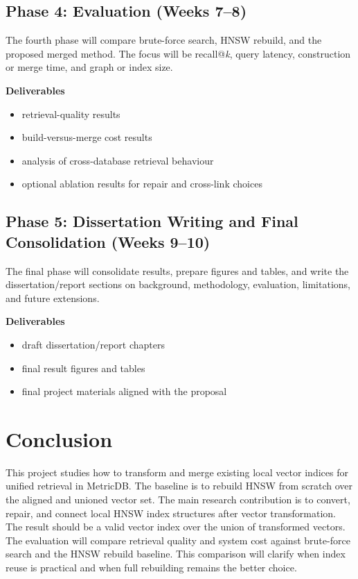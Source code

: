 \documentclass[11pt]{article}
\begin{document}
\subsection{Phase 4: Evaluation (Weeks 7--8)}

The fourth phase will compare brute-force search, HNSW rebuild, and the proposed merged method. The focus will be recall@\textit{k}, query latency, construction or merge time, and graph or index size.

\textbf{Deliverables}
\begin{itemize}
\item retrieval-quality results
\item build-versus-merge cost results
\item analysis of cross-database retrieval behaviour
\item optional ablation results for repair and cross-link choices
\end{itemize}

\subsection{Phase 5: Dissertation Writing and Final Consolidation (Weeks 9--10)}

The final phase will consolidate results, prepare figures and tables, and write the dissertation/report sections on background, methodology, evaluation, limitations, and future extensions.

\textbf{Deliverables}
\begin{itemize}
\item draft dissertation/report chapters
\item final result figures and tables
\item final project materials aligned with the proposal
\end{itemize}

\section{Conclusion}

This project studies how to transform and merge existing local vector indices for unified retrieval in MetricDB. The baseline is to rebuild HNSW from scratch over the aligned and unioned vector set. The main research contribution is to convert, repair, and connect local HNSW index structures after vector transformation. The result should be a valid vector index over the union of transformed vectors. The evaluation will compare retrieval quality and system cost against brute-force search and the HNSW rebuild baseline. This comparison will clarify when index reuse is practical and when full rebuilding remains the better choice.



\end{document}
